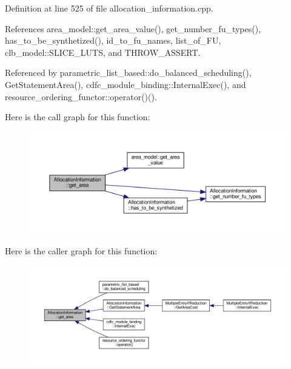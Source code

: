 Definition at line 525 of file allocation\+\_\+information.\+cpp.



References area\+\_\+model\+::get\+\_\+area\+\_\+value(), get\+\_\+number\+\_\+fu\+\_\+types(), has\+\_\+to\+\_\+be\+\_\+synthetized(), id\+\_\+to\+\_\+fu\+\_\+names, list\+\_\+of\+\_\+\+FU, clb\+\_\+model\+::\+S\+L\+I\+C\+E\+\_\+\+L\+U\+TS, and T\+H\+R\+O\+W\+\_\+\+A\+S\+S\+E\+RT.



Referenced by parametric\+\_\+list\+\_\+based\+::do\+\_\+balanced\+\_\+scheduling(), Get\+Statement\+Area(), cdfc\+\_\+module\+\_\+binding\+::\+Internal\+Exec(), and resource\+\_\+ordering\+\_\+functor\+::operator()().

Here is the call graph for this function\+:
\nopagebreak
\begin{figure}[H]
\begin{center}
\leavevmode
\includegraphics[width=350pt]{d7/d79/classAllocationInformation_a200074a0f73ed6e067be0d668517b7a5_cgraph}
\end{center}
\end{figure}
Here is the caller graph for this function\+:
\nopagebreak
\begin{figure}[H]
\begin{center}
\leavevmode
\includegraphics[width=350pt]{d7/d79/classAllocationInformation_a200074a0f73ed6e067be0d668517b7a5_icgraph}
\end{center}
\end{figure}
\mbox{\label{classAllocationInformation_ae46c25c700c15eb6ba2505f6527ca6f1}} 
